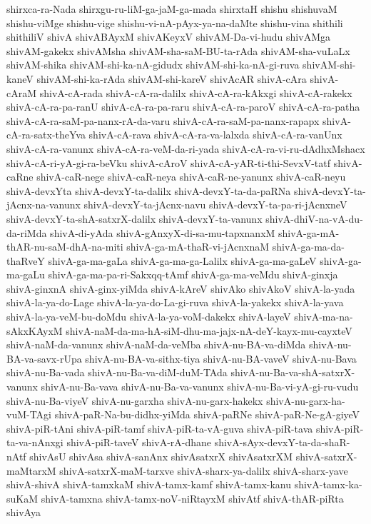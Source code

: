 {shirxca-ra-Nada
shirxgu-ru-liM-ga-jaM-ga-mada
shirxtaH
shishu
shishuvaM
shishu-viMge
shishu-vige
shishu-vi-nA-pAyx-ya-na-daMte
shishu-vina
shithili
shithiliV
shivA
shivABAyxM
shivAKeyxV
shivAM-Da-vi-hudu
shivAMga
shivAM-gakekx
shivAMsha
shivAM-sha-saM-BU-ta-rAda
shivAM-sha-vuLaLx
shivAM-shika
shivAM-shi-ka-nA-gidudx
shivAM-shi-ka-nA-gi-ruva
shivAM-shi-kaneV
shivAM-shi-ka-rAda
shivAM-shi-kareV
shivAcAR
shivA-cAra
shivA-cAraM
shivA-cA-rada
shivA-cA-ra-dalilx
shivA-cA-ra-kAkxgi
shivA-cA-rakekx
shivA-cA-ra-pa-ranU
shivA-cA-ra-pa-raru
shivA-cA-ra-paroV
shivA-cA-ra-patha
shivA-cA-ra-saM-pa-nanx-rA-da-varu
shivA-cA-ra-saM-pa-nanx-rapapx
shivA-cA-ra-satx-theYva
shivA-cA-rava
shivA-cA-ra-va-lalxda
shivA-cA-ra-vanUnx
shivA-cA-ra-vanunx
shivA-cA-ra-veM-da-ri-yada
shivA-cA-ra-vi-ru-dAdhxMshacx
shivA-cA-ri-yA-gi-ra-beVku
shivA-cAroV
shivA-cA-yAR-ti-thi-SevxV-tatf
shivA-caRne
shivA-caR-nege
shivA-caR-neya
shivA-caR-ne-yanunx
shivA-caR-neyu
shivA-devxYta
shivA-devxY-ta-dalilx
shivA-devxY-ta-da-paRNa
shivA-devxY-ta-jAcnx-na-vanunx
shivA-devxY-ta-jAcnx-navu
shivA-devxY-ta-pa-ri-jAcnxneV
shivA-devxY-ta-shA-satxrX-dalilx
shivA-devxY-ta-vanunx
shivA-dhiV-na-vA-du-da-riMda
shivA-di-yAda
shivA-gAnxyX-di-sa-mu-tapxnanxM
shivA-ga-mA-thAR-nu-saM-dhA-na-miti
shivA-ga-mA-thaR-vi-jAcnxnaM
shivA-ga-ma-da-thaRveY
shivA-ga-ma-gaLa
shivA-ga-ma-ga-Lalilx
shivA-ga-ma-gaLeV
shivA-ga-ma-gaLu
shivA-ga-ma-pa-ri-Sakxqq-tAmf
shivA-ga-ma-veMdu
shivA-ginxja
shivA-ginxnA
shivA-ginx-yiMda
shivA-kAreV
shivAko
shivAkoV
shivA-la-yada
shivA-la-ya-do-Lage
shivA-la-ya-do-La-gi-ruva
shivA-la-yakekx
shivA-la-yava
shivA-la-ya-veM-bu-doMdu
shivA-la-ya-voM-dakekx
shivA-layeV
shivA-ma-na-sAkxKAyxM
shivA-naM-da-ma-hA-siM-dhu-ma-jajx-nA-deY-kayx-mu-cayxteV
shivA-naM-da-vanunx
shivA-naM-da-veMba
shivA-nu-BA-va-diMda
shivA-nu-BA-va-savx-rUpa
shivA-nu-BA-va-sithx-tiya
shivA-nu-BA-vaveV
shivA-nu-Bava
shivA-nu-Ba-vada
shivA-nu-Ba-va-diM-duM-TAda
shivA-nu-Ba-va-shA-satxrX-vanunx
shivA-nu-Ba-vava
shivA-nu-Ba-va-vanunx
shivA-nu-Ba-vi-yA-gi-ru-vudu
shivA-nu-Ba-viyeV
shivA-nu-garxha
shivA-nu-garx-hakekx
shivA-nu-garx-ha-vuM-TAgi
shivA-paR-Na-bu-didhx-yiMda
shivA-paRNe
shivA-paR-Ne-gA-giyeV
shivA-piR-tAni
shivA-piR-tamf
shivA-piR-ta-vA-guva
shivA-piR-tava
shivA-piR-ta-va-nAnxgi
shivA-piR-taveV
shivA-rA-dhane
shivA-sAyx-devxY-ta-da-shaR-nAtf
shivAsU
shivAsa
shivA-sanAnx
shivAsatxrX
shivAsatxrXM
shivA-satxrX-maMtarxM
shivA-satxrX-maM-tarxve
shivA-sharx-ya-dalilx
shivA-sharx-yave
shivA-shivA
shivA-tamxkaM
shivA-tamx-kamf
shivA-tamx-kanu
shivA-tamx-ka-suKaM
shivA-tamxna
shivA-tamx-noV-niRtayxM
shivAtf
shivA-thAR-piRta
shivAya
}
